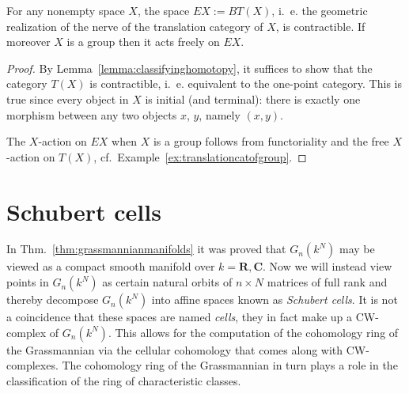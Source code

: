 \documentclass[a4paper,openany]{scrbook}
\newcommand{\chapterauthor}[1]{\hfill\emph{#1}\par\noindent}
\begin{document}
\begin{corollary}\label{cor:EG}
For any nonempty space $X$, the space $EX := BT(X)$, i.~e. the geometric realization of the nerve of the translation category of $X$, is contractible. If moreover $X$ is a group then it acts freely on $EX$.
\end{corollary}
\begin{proof}
By Lemma~\ref{lemma:classifyinghomotopy}, it suffices to show that the category $T(X)$ is contractible, i.~e. equivalent to the one-point category. This is true since every object in $X$ is initial (and terminal): there is exactly one morphism between any two objects $x$, $y$, namely $(x,y)$.

The $X$-action on $EX$ when $X$ is a group follows from functoriality and the free $X$-action on $T(X)$, cf.~Example~\ref{ex:translationcatofgroup}.
\end{proof}

\section{Schubert cells}

In Thm.~\ref{thm:grassmannianmanifolds} it was proved that $G_n(k^N)$ may be viewed as a compact smooth manifold over $k = \mathbf{R}, \mathbf{C}$. 
Now we will instead view points in $G_n(k^N)$ as certain natural orbits of $n \times N$ matrices of full rank and thereby decompose $G_n(k^N)$ into affine spaces known as \textit{Schubert cells}. 
It is not a coincidence that these spaces are named \textit{cells}, they in fact make up a CW-complex of $G_n(k^N)$. 
This allows for the computation of the cohomology ring of the Grassmannian via the cellular cohomology that comes along with CW-complexes. 
The cohomology ring of the Grassmannian in turn plays a role in the classification of the ring of characteristic classes. 
\end{document}
